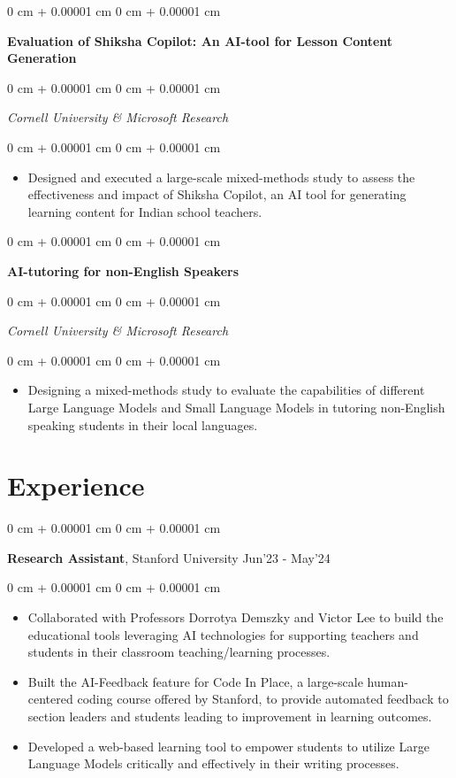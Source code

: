 \documentclass[10pt, letterpaper]{article}
\newenvironment{highlights}{
    \begin{itemize}[
        topsep=0.10 cm,
        parsep=0.10 cm,
        partopsep=0pt,
        itemsep=0pt,
        leftmargin=0 cm + 10pt
    ]
}{
    \end{itemize}
} %
\newenvironment{onecolentry}{
    \begin{adjustwidth}{
        0 cm + 0.00001 cm
    }{
        0 cm + 0.00001 cm
    }
}{
    \end{adjustwidth}
} %
\newenvironment{twocolentry}[2][]{
    \onecolentry
    \def\secondColumn{#2}
    \setcolumnwidth{\fill, 4.5 cm}
    \begin{paracol}{2}
}{
    \switchcolumn \raggedleft \secondColumn
    \end{paracol}
    \endonecolentry
} %
\newcommand{\datetext}[1]{\color{gray800}#1}
\newcommand{\experienceentry}[3]{
    \begin{twocolentry}{
        \datetext{#3}
    }
        \textbf{#1}, #2\end{twocolentry}

    \vspace{0.10 cm}
}
\newcommand{\researchprojectentry}[2]{
    \begin{onecolentry}
        \textbf{#1}
    \end{onecolentry}
    \vspace{0.06cm}
    \begin{onecolentry}
        \textit{#2}
    \end{onecolentry}
    \vspace{0.10cm}
}
\newcommand{\itemspacing}[1]{\vspace{0.275 cm}#1}
\begin{document}
        
        \researchprojectentry{Evaluation of Shiksha Copilot: An AI-tool for Lesson Content Generation}{Cornell University \& Microsoft Research}
            \begin{onecolentry}
                \begin{highlights}
                    \item Designed and executed a large-scale mixed-methods study to assess the effectiveness and impact of Shiksha Copilot, an AI tool for generating learning content for Indian school teachers.
                \end{highlights}
            \end{onecolentry}

        \itemspacing
            
            
        \researchprojectentry{AI-tutoring for non-English Speakers}{Cornell University \& Microsoft Research}
            \begin{onecolentry}
                \begin{highlights}
                    \item Designing a mixed-methods study to evaluate the capabilities of different Large Language Models and Small Language Models in tutoring non-English speaking students in their local languages.
                \end{highlights}
            \end{onecolentry}
            

    \section{Experience}
        \experienceentry{Research Assistant}{Stanford University}{Jun'23 - May'24}
        \begin{onecolentry}
            \begin{highlights}
                \item Collaborated with Professors Dorrotya Demszky and Victor Lee to build the educational tools leveraging AI technologies for supporting teachers and students in their classroom teaching/learning processes.
                \item Built the AI-Feedback feature for Code In Place, a large-scale human-centered coding course offered by Stanford, to provide automated feedback to section leaders and students leading to improvement in learning outcomes.
                \item Developed a web-based learning tool to empower students to utilize Large Language Models critically and effectively in their writing processes.
            \end{highlights}
        \end{onecolentry}
\end{document}
